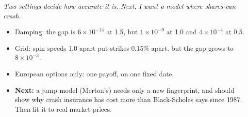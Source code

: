 \documentclass[10pt,a4paper]{article}
\newcommand{\lead}[1]{{\itshape\fontsize{11}{14}\selectfont\color{accent}#1}\par\vspace{1pt}}
\begin{document}
\lead{Two settings decide how accurate it is. Next, I want a model where shares can crash.}

\begin{itemize}
\item Damping: the gap is $6\times10^{-14}$ at 1.5, but $1\times10^{-9}$ at 1.0 and $4\times10^{-4}$ at 0.5.
\item Grid: spin speeds 1.0 apart put strikes 0.15\% apart, but the gap grows to $8\times10^{-3}$.
\item European options only: one payoff, on one fixed date.
\item \textbf{Next:} a jump model (Merton's) needs only a new fingerprint, and should show why crash insurance
has cost more than Black-Scholes says since 1987. Then fit it to real market prices.
\end{itemize}
\end{document}
